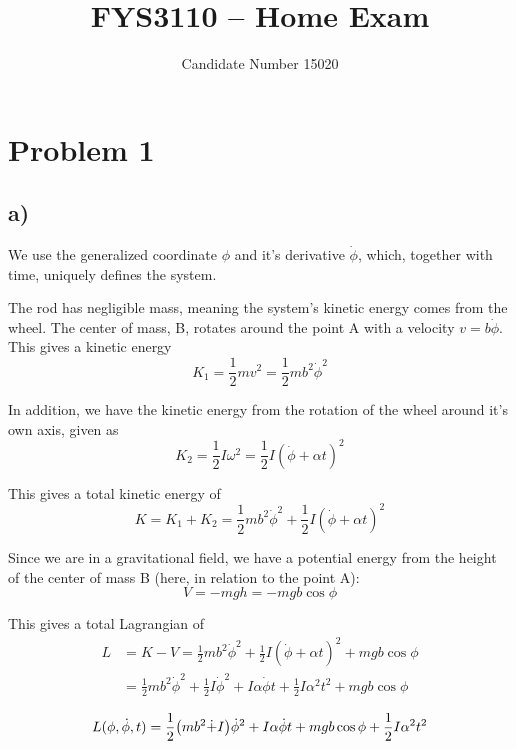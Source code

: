 \documentclass[12p,a4paper]{article}
\newcommand{\half}{\frac{1}{2}}
\begin{document}
\title{FYS3110 -- Home Exam}
\author{
    \begin{tabular}{r l}
        Candidate Number 15020
    \end{tabular}}

\maketitle

\section*{Problem 1}
\subsection*{a)}
We use the generalized coordinate $\phi$ and it's derivative $\dot{\phi}$, which, together with time, uniquely defines the system.

The rod has negligible mass, meaning the system's kinetic energy comes from the wheel. The center of mass, B, rotates around the point A with a velocity $v = b\dot{\phi}$. This gives a kinetic energy
\[
    K_1 = \half m v^2 = \half m b^2\dot{\phi}^2
\]

In addition, we have the kinetic energy from the rotation of the wheel around it's own axis, given as
\[
    K_2 = \half I\omega^2 = \half I (\dot{\phi} + \alpha t)^2
\]

This gives a total kinetic energy of
\[
    K = K_1 + K_2 = \half m b^2\dot{\phi}^2 + \half I(\dot{\phi} + \alpha t)^2
\]

Since we are in a gravitational field, we have a potential energy from the height of the center of mass B (here, in relation to the point A):
\[
    V = -mgh = -mgb\cos{\phi}
\]

This gives a total Lagrangian of 
\begin{align*}
    L &= K - V = \half m b^2\dot{\phi}^2 + \half I(\dot{\phi} + \alpha t)^2 + mgb\cos{\phi} \\
    &= \half m b^2\dot{\phi}^2 + \half I \dot{\phi}^2 + I\alpha\dot{\phi}t + \half I \alpha^2 t^2 + mgb\cos{\phi} \\
\end{align*}
\begin{equation}\label{eqn:Lagr}
    L(\phi, \dot{\phi}, t) = \half \qty(m b^2\dot + I)\dot{\phi}^2 + I\alpha\dot{\phi}t + mgb\cos{\phi} + \half I \alpha^2 t^2
\end{equation}
\end{document}
